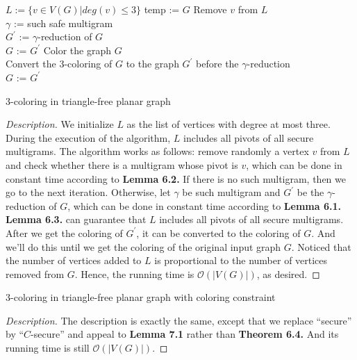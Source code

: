\begin{algorithm}[H]
\DontPrintSemicolon
  $L := \{v \in V(G) | deg(v) \leq 3\}$  
  temp := $G$   
    { 
         Remove $v$ from $L$ \\
        {
            \Statex $\gamma$ := such safe multigram \\
            $G^{'}$ := $\gamma$-reduction of $G$ \\
            $G$ := $G^{'}$ 
        }
    }
   {
        Color the graph $G$ \\
   		Convert the 3-coloring of $G$ to the graph $G^{'}$ before the $\gamma$-reduction \\
   		$G$ := $G^{'}$
   }
\caption{3-coloring in triangle-free planar graph}
\end{algorithm}
\begin{proof}[Description] We initialize $L$ as the list of vertices with degree at most three. During the execution of the algorithm, $L$ includes all pivots of all secure multigrams. The algorithm works as follows: remove randomly a vertex $v$ from $L$ and check whether there is a multigram whose pivot is $v$, which can be done in constant time according to \textbf{Lemma 6.2.} If there is no such multigram, then we go to the next iteration. Otherwise, let $\gamma$ be such multigram and $G^{'}$ be the $\gamma$-reduction of $G$, which can be done in constant time according to \textbf{Lemma 6.1.} \textbf{Lemma 6.3.} can guarantee that $L$ includes all pivots of all secure multigrams. After we get the coloring of $G^{'}$, it can be converted to the coloring of $G$. And we'll do this until we get the coloring of the original input graph $G$. Noticed that the number of vertices added to $L$ is proportional to the number of vertices removed from $G$. Hence, the running time is $\mathcal{O}(|V(G)|)$, as desired.
\end{proof}

\begin{algorithm}[H]
\DontPrintSemicolon
\caption{3-coloring in triangle-free planar graph with coloring constraint}
\end{algorithm}
\begin{proof}[Description] 
The description is exactly the same, except that we replace
“secure” by “$C$-secure” and appeal to \textbf{Lemma 7.1} rather than \textbf{Theorem 6.4.} And its running time is still $\mathcal{O}(|V(G)|)$.\cite{dvorak2013threecoloring}
\end{proof}

